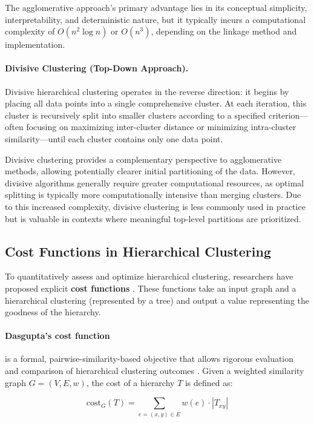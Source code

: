 The agglomerative approach's primary advantage lies in its conceptual
simplicity, interpretability, and deterministic nature, but it
typically incurs a computational complexity of \(O(n^2\log n)\) or
\(O(n^3)\), depending on the linkage method and implementation.

\paragraph{Divisive Clustering (Top-Down Approach).}
Divisive hierarchical clustering operates in the reverse direction:
it begins by placing all data points into a single comprehensive
cluster. At each iteration, this cluster is recursively split into
smaller clusters according to a specified criterion—often focusing on
maximizing inter-cluster distance or minimizing intra-cluster
similarity—until each cluster contains only one data point.

Divisive clustering provides a complementary perspective to
agglomerative methods, allowing potentially clearer initial
partitioning of the data. However, divisive algorithms generally
require greater computational resources, as optimal splitting is
typically more computationally intensive than merging clusters. Due
to this increased complexity, divisive clustering is less commonly
used in practice but is valuable in contexts where meaningful
top-level partitions are prioritized.

\subsection{Cost Functions in Hierarchical Clustering}
To quantitatively assess and optimize hierarchical clustering,
researchers have proposed explicit \textbf{cost functions}
\cite{dasgupta2016cost}. These functions take an input graph and a
hierarchical clustering (represented by a tree) and output a value
representing the goodness of the hierarchy.

\paragraph{Dasgupta's cost function} is a formal,
pairwise-similarity-based objective that allows rigorous evaluation
and comparison of hierarchical clustering outcomes
\cite{dasgupta2016cost}. Given a weighted similarity graph
$G=(V,E,w)$, the cost of a hierarchy $T$ is defined as:

\begin{equation*}
  \text{cost}_G(T) = \sum_{e=(x,y) \in E} w(e) \cdot |T_{xy}|
\end{equation*}

